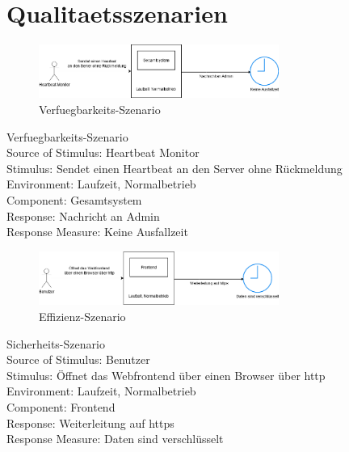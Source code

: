 \chapter{Qualitaetsszenarien}
\label{ch:Qualitaetsszenarien}


\begin{figure}[tbh]
  \centering
  \includegraphics[width=0.7\textwidth]{Graphics/Verfuegbarkeit.png}
  \caption{Verfuegbarkeits-Szenario}
  \label{fig:Qualitaet1}
\end{figure}

Verfuegbarkeits-Szenario\\
Source of Stimulus: Heartbeat Monitor\\
Stimulus: Sendet einen Heartbeat an den Server ohne Rückmeldung\\
Environment: Laufzeit, Normalbetrieb\\
Component: Gesamtsystem\\
Response: Nachricht an Admin\\
Response Measure: Keine Ausfallzeit\\




\begin{figure}[tbh]
  \centering
  \includegraphics[width=0.7\textwidth]{Graphics/Sicherheit.png}
  \caption{Effizienz-Szenario}
  \label{fig:Qualitaet2}
\end{figure}


Sicherheits-Szenario\\
Source of Stimulus: Benutzer\\
Stimulus: Öffnet das Webfrontend über einen Browser über http\\
Environment: Laufzeit, Normalbetrieb\\
Component: Frontend\\
Response: Weiterleitung auf https\\
Response Measure: Daten sind verschlüsselt\\




